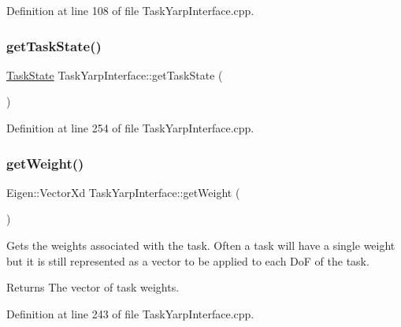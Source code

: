 Definition at line 108 of file Task\+Yarp\+Interface.\+cpp.

\hypertarget{classocra_1_1TaskYarpInterface_abf9665d9838a617c156012243aae047e}{}\label{classocra_1_1TaskYarpInterface_abf9665d9838a617c156012243aae047e} 
\subsubsection{\texorpdfstring{get\+Task\+State()}{getTaskState()}}
{\footnotesize\ttfamily \hyperlink{classocra_1_1TaskState}{Task\+State} Task\+Yarp\+Interface\+::get\+Task\+State (\begin{DoxyParamCaption}{ }\end{DoxyParamCaption})}



Definition at line 254 of file Task\+Yarp\+Interface.\+cpp.

\hypertarget{classocra_1_1TaskYarpInterface_a3e97841d50244fa093734e1d098caf79}{}\label{classocra_1_1TaskYarpInterface_a3e97841d50244fa093734e1d098caf79} 
\subsubsection{\texorpdfstring{get\+Weight()}{getWeight()}}
{\footnotesize\ttfamily Eigen\+::\+Vector\+Xd Task\+Yarp\+Interface\+::get\+Weight (\begin{DoxyParamCaption}{ }\end{DoxyParamCaption})}

Gets the weights associated with the task. Often a task will have a single weight but it is still represented as a vector to be applied to each DoF of the task.

\begin{DoxyReturn}{Returns}
The vector of task weights. 
\end{DoxyReturn}


Definition at line 243 of file Task\+Yarp\+Interface.\+cpp.

\hypertarget{classocra_1_1TaskYarpInterface_ad5e0f75caab96459b864699b18fd60ff}{}\label{classocra_1_1TaskYarpInterface_ad5e0f75caab96459b864699b18fd60ff} 
